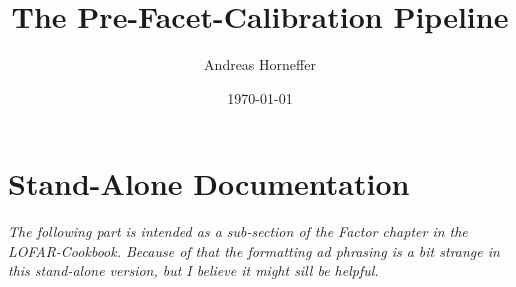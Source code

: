 \documentclass[12pt, a4paper, onecolumn]{article}
\title{\bf  The Pre-Facet-Calibration Pipeline }
\author{Andreas Horneffer}
\date{\today}
\begin{document}
\maketitle

\section{Stand-Alone Documentation}

{\it The following part is intended as a sub-section of the Factor chapter in the LOFAR-Cookbook.
Because of that the formatting ad phrasing is a bit strange in this stand-alone version, but I believe 
it might sill be helpful.}


\end{document}
